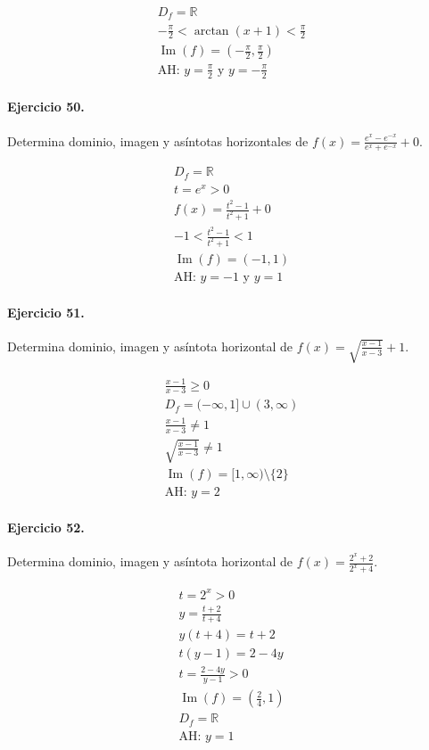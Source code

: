 \documentclass[11pt,a4paper]{article}
\begin{document}
\[
\begin{aligned}
D_f=\mathbb{R}\\
-\frac{\pi}{2}<\arctan(x+1)<\frac{\pi}{2}\\
\operatorname{Im}(f)=\left(-\frac{\pi}{2},\frac{\pi}{2}\right)\\
\text{AH: }y=\frac{\pi}{2}\text{ y }y=-\frac{\pi}{2}
\end{aligned}
\]


\paragraph{Ejercicio 50.} Determina dominio, imagen y asíntotas horizontales de $f(x)=\frac{e^x-e^{-x}}{e^x+e^{-x}}+0$.

\[
\begin{aligned}
D_f=\mathbb{R}\\
t=e^x>0\\
f(x)=\frac{t^2-1}{t^2+1}+0\\
-1<\frac{t^2-1}{t^2+1}<1\\
\operatorname{Im}(f)=(-1,1)\\
\text{AH: }y=-1\text{ y }y=1
\end{aligned}
\]


\paragraph{Ejercicio 51.} Determina dominio, imagen y asíntota horizontal de $f(x)=\sqrt{\frac{x-1}{x-3}}+1$.

\[
\begin{aligned}
\frac{x-1}{x-3}\ge0\\
D_f=(-\infty,1]\cup(3,\infty)\\
\frac{x-1}{x-3}\ne1\\
\sqrt{\frac{x-1}{x-3}}\ne1\\
\operatorname{Im}(f)=[1,\infty)\setminus\{2\}\\
\text{AH: }y=2
\end{aligned}
\]


\paragraph{Ejercicio 52.} Determina dominio, imagen y asíntota horizontal de $f(x)=\frac{2^x+2}{2^x+4}$. 

\[
\begin{aligned}
t=2^x>0\\
y=\frac{t+2}{t+4}\\
y(t+4)=t+2\\
t(y-1)=2-4y\\
t=\frac{2-4y}{y-1}>0\\
\operatorname{Im}(f)=(\frac{2}{4},1)\\
D_f=\mathbb{R}\\
\text{{AH: }}y=1
\end{aligned}
\]
\end{document}
